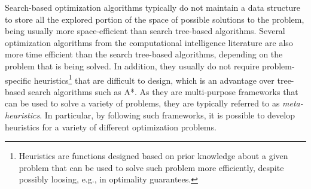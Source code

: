 Search-based optimization algorithms typically do not maintain a data structure to store all the explored portion of the space of possible solutions to the problem, being usually more space-efficient than search tree-based algorithms. Several optimization algorithms from the computational intelligence literature are also more time efficient than the search tree-based algorithms, depending on the problem that is being solved. In addition, they usually do not require problem-specific heuristics\footnote{Heuristics are functions designed based on prior knowledge about a given problem that can be used to solve such problem more efficiently, despite possibly loosing, e.g., in optimality guarantees.} that are difficult to design, which is an advantage over tree-based search algorithms such as A*. As they are multi-purpose frameworks that can be used to solve a variety of problems, they are typically referred to as \textit{meta-heuristics}. In particular, by following such frameworks, it is possible to develop heuristics for a variety of different optimization problems.




%
%




